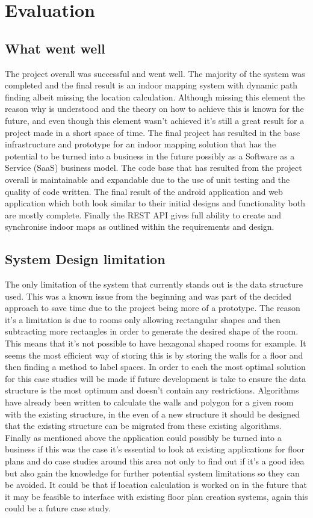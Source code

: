 \section{Evaluation}
\subsection{What went well} %
The project overall was successful and went well. The majority of the system was completed and the final result is an indoor mapping system with dynamic path finding albeit missing the location calculation. Although missing this element the reason why is understood and the theory on how to achieve this is known for the future, and even though this element wasn't achieved it's still a great result for a project made in a short space of time. The final project has resulted in the base infrastructure and prototype for an indoor mapping solution that has the potential to be turned into a business in the future possibly as a Software as a Service (SaaS) business model. The code base that has resulted from the project overall is maintainable and expandable due to the use of unit testing and the quality of code written. The final result of the android application and web application which both look similar to their initial designs and functionality both are mostly complete. Finally the REST API gives full ability to create and synchronise indoor maps as outlined within the requirements and design.

\subsection{System Design limitation}
The only limitation of the system that currently stands out is the data structure used. This was a known issue from the beginning and was part of the decided approach to save time due to the project being more of a prototype. The reason it's a limitation is due to rooms only allowing rectangular shapes and then subtracting more rectangles in order to generate the desired shape of the room. This means that it's not possible to have hexagonal shaped rooms for example. It seems the most efficient way of storing this is by storing the walls for a floor and then finding a method to label spaces. In order to each the most optimal solution  for this case studies will be made if future development is take to ensure the data structure is the most optimum and doesn't contain any restrictions. Algorithms have already been written to calculate the walls and polygon for a given room with the existing structure, in the even of a new structure it should be designed that the existing structure can be migrated from these existing algorithms. Finally as mentioned above the application could possibly be turned into a business if this was the case it's essential to look at existing applications for floor plans and do case studies around this area not only to find out if it's a good idea but also gain the knowledge for further potential system limitations so they can be avoided. It could be that if location calculation is worked on in the future that it may be feasible to interface with existing floor plan creation systems, again this could be a future case study.

